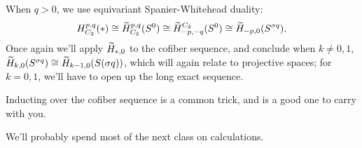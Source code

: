 When $q > 0$, we use equivariant Spanier-Whitehead duality:
\[H_{C_2}^{p,q}(*)\cong \widetilde H_{C_2}^{p,q}(S^0)\cong \widetilde H_{-p,-q}^{C_2}(S^0)\cong \widetilde H_{-p,0}(S^{\sigma q}).\]
Once again we'll apply $\widetilde H_{*,0}$ to the cofiber sequence, and conclude when $k\ne 0,1$, $\widetilde H_{k,0}(S^{\sigma
q})\cong \widetilde H_{k-1,0}(S(\sigma q))$, which will again relate to projective spaces; for $k = 0,1$, we'll have to open
up the long exact sequence.

Inducting over the cofiber sequence is a common trick, and is a good one to carry with you.

We'll probably spend most of the next class on calculations.
